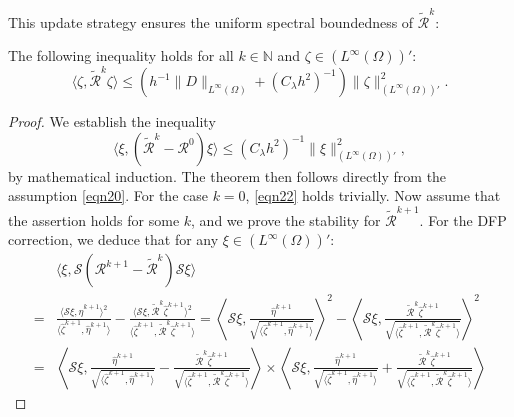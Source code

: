 \documentclass[onefignum,onetabnum]{siamart190516}
\numberwithin{equation}{section}
\begin{document}
This update strategy ensures the uniform spectral boundedness of $\widetilde{\mathcal{R}}^{k}$:
\begin{theorem}\label{thm1}
The following inequality holds for all $k \in \mathbb{N}$ and $\zeta \in (L^{\infty}(\Omega))'$:
\begin{equation}\label{eqn19}
\langle \zeta, \widetilde{\mathcal{R}}^{k}\zeta\rangle \leq (h^{-1}\|D\|_{L^\infty(\Omega)}+(C_{\lambda}h^{2})^{-1} )\|\zeta\|_{(L^\infty(\Omega))'}^2.
\end{equation}
\end{theorem}
\begin{proof}
We establish the inequality
\begin{equation}\label{eqn22}
\langle \xi, (\widetilde{\mathcal{R}}^{k}-\mathcal{R}^{0})\xi\rangle \leq (C_{\lambda}h^{2})^{-1}\|\xi\|_{(L^{\infty}(\Omega))'}^{2},
\end{equation}
by mathematical induction. The theorem then follows directly from the assumption \eqref{eqn20}.
For the case $k=0$, \eqref{eqn22} holds trivially.
Now assume that the assertion holds for some $k$, and we prove the stability for $\widetilde{\mathcal{R}}^{k+1}$.
For the DFP correction, we deduce that for any $\xi \in (L^{\infty}(\Omega))'$:
\begin{align*}
{}&\langle \xi, \mathcal{S}(\mathcal{R}^{k+1} - \widetilde{\mathcal{R}}^{k})\mathcal{S}\xi \rangle \\
=& \frac{\langle \mathcal{S}\xi, \hat{\eta}^{k+1} \rangle^{2}}{\langle \hat{\zeta}^{k+1}, \hat{\eta}^{k+1} \rangle} - \frac{\langle \mathcal{S}\xi, \widetilde{\mathcal{R}}^{k}\hat{\zeta}^{k+1} \rangle^{2}}{\langle \hat{\zeta}^{k+1}, \widetilde{\mathcal{R}}^{k}\hat{\zeta}^{k+1} \rangle}
= \left\langle \mathcal{S}\xi, \frac{\hat{\eta}^{k+1}}{\sqrt{\langle \hat{\zeta}^{k+1}, \hat{\eta}^{k+1} \rangle}} \right\rangle^{2} - \left\langle \mathcal{S}\xi, \frac{\widetilde{\mathcal{R}}^{k}\hat{\zeta}^{k+1}}{\sqrt{\langle \hat{\zeta}^{k+1}, \widetilde{\mathcal{R}}^{k}\hat{\zeta}^{k+1} \rangle}} \right\rangle^{2} \\
=& \left\langle \mathcal{S}\xi, \frac{\hat{\eta}^{k+1}}{\sqrt{\langle \hat{\zeta}^{k+1}, \hat{\eta}^{k+1} \rangle}} - \frac{\widetilde{\mathcal{R}}^{k}\hat{\zeta}^{k+1}}{\sqrt{\langle \hat{\zeta}^{k+1}, \widetilde{\mathcal{R}}^{k}\hat{\zeta}^{k+1} \rangle}} \right\rangle
{} \times \left\langle \mathcal{S}\xi, \frac{\hat{\eta}^{k+1}}{\sqrt{\langle \hat{\zeta}^{k+1}, \hat{\eta}^{k+1} \rangle}} + \frac{\widetilde{\mathcal{R}}^{k}\hat{\zeta}^{k+1}}{\sqrt{\langle \hat{\zeta}^{k+1}, \widetilde{\mathcal{R}}^{k}\hat{\zeta}^{k+1} \rangle}} \right\rangle 

\end{align*}
\end{proof}
\end{document}
